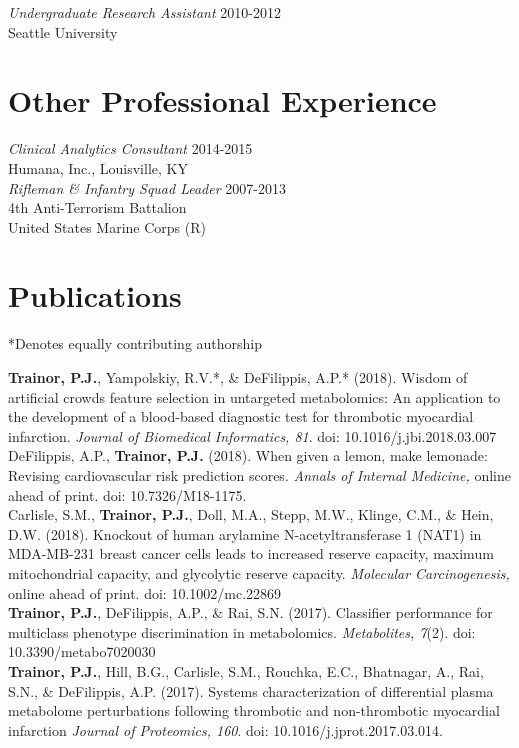 {\emph{Undergraduate Research Assistant} \hfill 2010-2012 \\
Seattle University

\section*{Other Professional Experience}
\emph{Clinical Analytics Consultant} \hfill 2014-2015 \\
Humana, Inc., Louisville, KY \\

\emph{Rifleman \& Infantry Squad Leader} \hfill 2007-2013 \\
4th Anti-Terrorism Battalion \\
United States Marine Corps (R) 

\section*{Publications}
*Denotes equally contributing authorship 

\textbf{Trainor, P.J.}, Yampolskiy, R.V.*, \& DeFilippis, A.P.* (2018). Wisdom of artificial crowds feature selection in untargeted metabolomics: An application to the development of a blood-based diagnostic test for thrombotic myocardial infarction. \emph{Journal of Biomedical Informatics, 81}.  doi: 10.1016/j.jbi.2018.03.007  \\

DeFilippis, A.P., \textbf{Trainor, P.J.} (2018). When given a lemon, make lemonade: Revising cardiovascular risk prediction scores. \emph{Annals of Internal Medicine,} online ahead of print. doi: 10.7326/M18-1175. \\

Carlisle, S.M., \textbf{Trainor, P.J.}, Doll, M.A., Stepp, M.W., Klinge, C.M., \& Hein, D.W. (2018). Knockout of human arylamine N-acetyltransferase 1 (NAT1) in MDA-MB-231 breast
cancer cells leads to increased reserve capacity, maximum mitochondrial capacity, and glycolytic reserve capacity. \emph{Molecular Carcinogenesis,} online ahead of print. doi: 10.1002/mc.22869\\

\textbf{Trainor, P.J.}, DeFilippis, A.P., \& Rai, S.N. (2017). Classifier performance for multiclass phenotype discrimination in metabolomics. \emph{Metabolites, 7}(2). doi: 10.3390/metabo7020030 \\

\textbf{Trainor, P.J.}, Hill, B.G., Carlisle, S.M., Rouchka, E.C., Bhatnagar, A., Rai, S.N., \& DeFilippis, A.P. (2017). Systems characterization of differential plasma metabolome perturbations following thrombotic and non-thrombotic myocardial infarction \emph{Journal of Proteomics, 160}. doi: 10.1016/j.jprot.2017.03.014. \\

}
